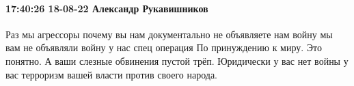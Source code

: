  
 
 
 
 

\paragraph{17:40:26 18-08-22 Александр Рукавишников}

Раз мы агрессоры почему вы нам документально не объявляете нам войну мы вам не
объявляли войну у нас спец операция По принуждению к миру. Это понятно. А ваши
слезные обвинения пустой трёп. Юридически у вас нет войны у вас терроризм вашей
власти против своего народа.
